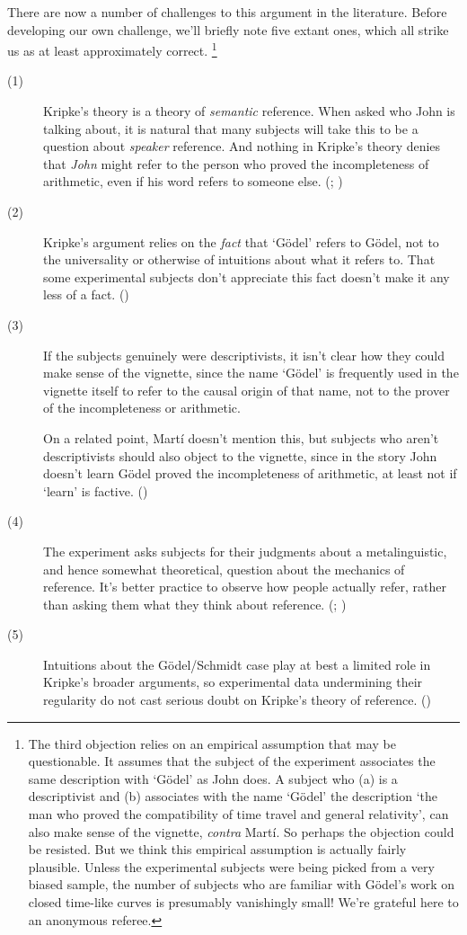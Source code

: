 \documentclass[
  11pt,
  letterpaper,
  DIV=11,
  numbers=noendperiod,
  twoside]{scrartcl}
\begin{document}
There are now a number of challenges to this argument in the literature.
Before developing our own challenge, we'll briefly note five extant
ones, which all strike us as at least approximately correct. \footnote{The
  third objection relies on an empirical assumption that may be
  questionable. It assumes that the subject of the experiment associates
  the same description with `Gödel' as John does. A subject who (a) is a
  descriptivist and (b) associates with the name `Gödel' the description
  `the man who proved the compatibility of time travel and general
  relativity', can also make sense of the vignette, \emph{contra} Martí.
  So perhaps the objection could be resisted. But we think this
  empirical assumption is actually fairly plausible. Unless the
  experimental subjects were being picked from a very biased sample, the
  number of subjects who are familiar with Gödel's work on closed
  time-like curves is presumably vanishingly small! We're grateful here
  to an anonymous referee.}

\begin{description}
\item[(1)]
Kripke's theory is a theory of \emph{semantic} reference. When asked who
John is talking about, it is natural that many subjects will take this
to be a question about \emph{speaker} reference. And nothing in Kripke's
theory denies that \emph{John} might refer to the person who proved the
incompleteness of arithmetic, even if his word refers to someone else.
(;
)
\item[(2)]
Kripke's argument relies on the \emph{fact} that `Gödel' refers to
Gödel, not to the universality or otherwise of intuitions about what it
refers to. That some experimental subjects don't appreciate this fact
doesn't make it any less of a fact. ()
\item[(3)]
If the subjects genuinely were descriptivists, it isn't clear how they
could make sense of the vignette, since the name `Gödel' is frequently
used in the vignette itself to refer to the causal origin of that name,
not to the prover of the incompleteness or arithmetic.

On a related point, Martí doesn't mention this, but subjects who aren't
descriptivists should also object to the vignette, since in the story
John doesn't learn Gödel proved the incompleteness of arithmetic, at
least not if `learn' is factive. ()
\item[(4)]
The experiment asks subjects for their judgments about a metalinguistic,
and hence somewhat theoretical, question about the mechanics of
reference. It's better practice to observe how people actually refer,
rather than asking them what they think about reference.
(; )
\item[(5)]
Intuitions about the Gödel/Schmidt case play at best a limited role in
Kripke's broader arguments, so experimental data undermining their
regularity do not cast serious doubt on Kripke's theory of reference.
()
\end{description}
\end{document}

